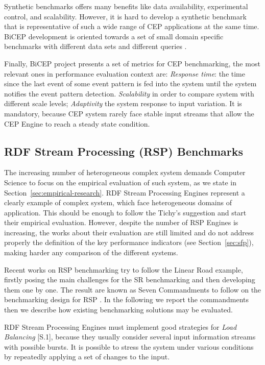 Synthetic benchmarks offers many benefits like data availability, experimental control, and scalability. However, it is hard to develop a synthetic benchmark that is representative of such a wide range of CEP applications at the same time. BiCEP development is oriented towards a set of small domain specific benchmarks with different data sets and different queries \cite{bizarro:DSP:2007:1143}.

Finally, BiCEP project presents a set of metrics for CEP benchmarking, the most relevant ones in performance evaluation context are: \textit{Response time}: the time since the last event of some event pattern is fed into the system until the system notifies the event pattern detection. \textit{Scalability} in order to compare system with different scale levels; \textit{Adaptivity} the system response to input variation. It is mandatory, because CEP system rarely face stable input streams that allow the CEP Engine to reach a steady state condition.

\subsection{RDF Stream Processing (RSP) Benchmarks}\label{sec:sr-benchmarking}

The increasing number of heterogeneous complex system demands Computer Science to focus on the empirical evaluation of such system, as we state in Section~\ref{sec:empirical-research}. RDF Stream Processing Engines represent a clearly example of complex system, which face heterogeneous domains of application. This should be enough to follow the Tichy's suggestion and start their empirical evaluation. However, despite the number of RSP Engines is increasing, the works about their evaluation are still limited and do not address properly the definition of the key performance indicators (see Section~\ref{sec:sfp}), making harder any comparison of  the different systems.

Recent works on RSP benchmarking try to follow the Linear Road example, firstly posing the main challenges for the SR benchmarking  and then developing them one by one. The result are known as Seven Commandments to follow on the benchmarking design for RSP \cite{DBLP:conf/esws/ScharrenbachUMVB13}. In the following we report the commandments then we describe how existing benchmarking solutions may be evaluated.
 
RDF Stream Processing Engines must implement good strategies for \textit{Load Balancing} [S.1], because they usually consider several input information streams with possible bursts. It is possible to stress the system under various conditions by repeatedly applying a set of changes to the input.

